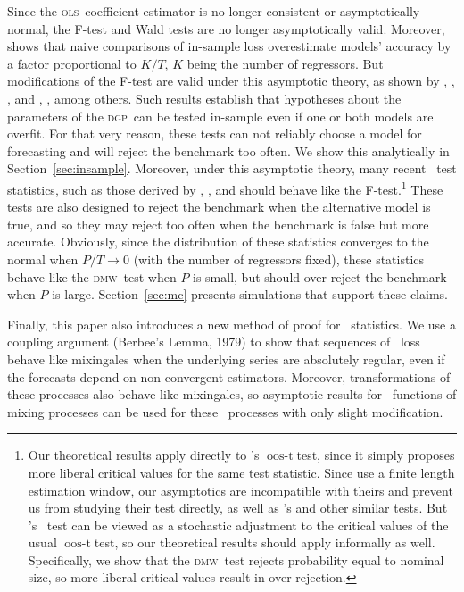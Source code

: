 \documentclass[11pt]{article}
\newcommand{\citepos}[1]{\citeauthor{#1}'s \citeyearpar{#1}}
\newcommand{\clws}{\citeauthor{ClW:06}'s \citeyearpar{ClW:06,ClW:07}}
\newcommand{\oost}{\ensuremath{\operatorname{oos-t}}}
\newcommand{\dmw}{\textsc{dmw}}
\newcommand{\ols}{\textsc{ols}}
\newcommand{\dgp}{\textsc{dgp}}
\begin{document}
Since the \ols\ coefficient estimator is no longer consistent or
asymptotically normal, the F-test and Wald tests are no longer
asymptotically valid.  Moreover, \citet{Efr:86,Efr:04} shows that
naive comparisons of in-sample loss overestimate models' accuracy by a
factor proportional to $K/T$, $K$ being the number of regressors.  But
modifications of the F-test are valid under this asymptotic theory, as
shown by \citet{BoB:95}, \citet{AkA:00}, \citet{AkP:04}, and
\citet{Ana:12}, \citet{Cal:11c}, among others.  Such results establish
that hypotheses about the parameters of the \dgp\ can be tested
in-sample even if one or both models are overfit.  For that very
reason, these tests can not reliably choose a model for forecasting
and will reject the benchmark too often.  We show this analytically in
Section~\ref{sec:insample}.  Moreover, under this asymptotic theory,
many recent \oos\ test statistics, such as those derived by
\cite{ClM:01,ClM:05}, \citet{Mcc:07}, and \citet{ClW:06,ClW:07} should
behave like the F-test.\footnote{Our theoretical results apply
  directly to \citepos{Mcc:07} \oost test, since it simply proposes
  more liberal critical values for the same test statistic.  Since
  \citet{ClW:06,ClW:07} use a finite length estimation window, our
  asymptotics are incompatible with theirs and prevent us from
  studying their test directly, as well as \citepos{GiW:06} and other
  similar tests.  But \clws\ test can be viewed as a stochastic
  adjustment to the critical values of the usual \oost test, so our
  theoretical results should apply informally as well.  Specifically,
  we show that the \dmw\ test rejects probability equal to nominal
  size, so more liberal critical values result in over-rejection.}
These tests are also designed to reject the benchmark when the
alternative model is true, and so they may reject too often when the
benchmark is false but more accurate.  Obviously, since the
distribution of these statistics converges to the normal when $P/T \to
0$ (with the number of regressors fixed), these statistics behave like
the \dmw\ test when $P$ is small, but should over-reject the benchmark
when $P$ is large.  Section~\ref{sec:mc} presents simulations that
support these claims.

Finally, this paper also introduces a new method of proof for \oos\
statistics.  We use a coupling argument (Berbee's Lemma, 1979) to show
that sequences of \oos\ loss behave like mixingales when the
underlying series are absolutely regular, even if the forecasts depend
on non-convergent estimators.  Moreover, transformations of these
processes also behave like mixingales, so asymptotic results for \ned\
functions of mixing processes can be used for these \oos\ processes
with only slight modification.
\end{document}
